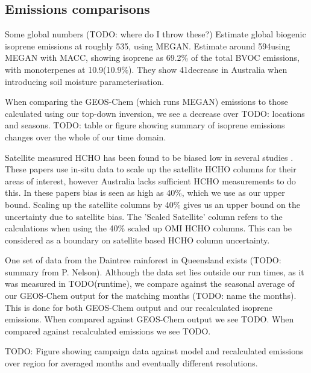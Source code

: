   
  
  
  
  \subsection{Emissions comparisons}
    
    Some global numbers (TODO: where do I throw these?)
    \textcite{Guenther2012} Estimate global biogenic isoprene emissions at roughly 535\tgpyr, using MEGAN.
    \textcite{Sindelarova2014} Estimate around 594\tgpyr using MEGAN with MACC, showing isoprene as 69.2\% of the total BVOC emissions, with monoterpenes at 10.9\tgpyr (10.9\%).
    They show 41\tgpyr decrease in Australia when introducing soil moisture parameterisation.
    
    When comparing the GEOS-Chem (which runs MEGAN) emissions to those calculated using our top-down inversion, we see a decrease over TODO: locations and seasons.
    TODO: table or figure showing summary of isoprene emissions changes over the whole of our time domain.
    
    Satellite measured HCHO has been found to be biased low in several studies \textcite[eg.][]{Zhu2016,DeSmedt2015,Barkley2013}.
    These papers use in-situ data to scale up the satellite HCHO columns for their areas of interest, however Australia lacks sufficient HCHO measurements to do this.
    In these papers bias is seen as high as 40\%, which we use as our upper bound.
    Scaling up the satellite columns by 40\% gives us an upper bound on the uncertainty due to satellite bias.
    The 'Scaled Satellite' column refers to the calculations when using the 40\% scaled up OMI HCHO columns. %
    This can be considered as a boundary on satellite based HCHO column uncertainty.
    
    One set of data from the Daintree rainforest in Queensland exists (TODO: summary from P. Nelson).
    Although the data set lies outside our run times, as it was measured in TODO(runtime), we compare against the seasonal average of our GEOS-Chem output for the matching months (TODO: name the months).
    This is done for both GEOS-Chem output and our recalculated isoprene emissions.
    When compared against GEOS-Chem output we see TODO.
    When compared against recalculated emissions we see TODO.
    
    TODO: Figure showing campaign data against model and recalculated emissions over region for averaged months and eventually different resolutions.
    
